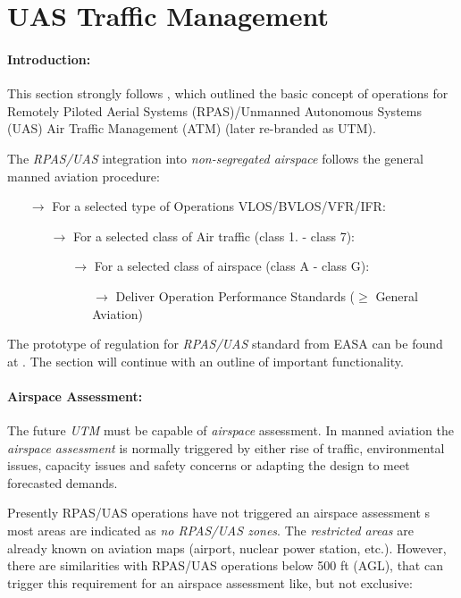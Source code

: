 \section{UAS Traffic Management}\label{sec:UTM}
\paragraph{Introduction:} This section strongly follows \cite{eurocontrol2018rpasatm}, which outlined the basic concept of operations for Remotely Piloted Aerial Systems (RPAS)/Unmanned Autonomous Systems (UAS) Air Traffic Management (ATM) (later re-branded as UTM).

The \emph{RPAS/UAS} integration into \emph{non-segregated airspace} follows the general manned aviation procedure:
\begin{itemize}
    \item[$\to$] For a selected type of Operations VLOS/BVLOS/VFR/IFR:
    \begin{itemize}
        \item[$\to$] For a selected class of Air traffic (class 1. - class 7):
        \begin{itemize}
            \item[$\to$] For a selected class of airspace (class A -  class G):
            \begin{itemize}
                \item[$\to$] Deliver Operation Performance Standards ($\ge$ General Aviation)
            \end{itemize}
        \end{itemize}
    \end{itemize}
\end{itemize}

\noindent  The prototype of regulation for \emph{RPAS/UAS} standard from EASA can be found at \cite{easa2016rpasroperegul}. The section will continue with an outline of important functionality.

\paragraph{Airspace Assessment:} The future \emph{UTM} must be capable of \emph{airspace} assessment. In manned aviation the \emph{airspace assessment} is normally triggered by either rise of traffic, environmental issues, capacity issues and safety concerns or adapting the design to meet forecasted demands.

Presently RPAS/UAS operations have not triggered an airspace assessment s most areas are indicated as \emph{no RPAS/UAS zones}. The \emph{restricted areas} are already known on aviation maps (airport, nuclear power station, etc.). However, there are similarities with RPAS/UAS operations below 500 ft (AGL), that can trigger this requirement for an airspace assessment like, but not exclusive:

